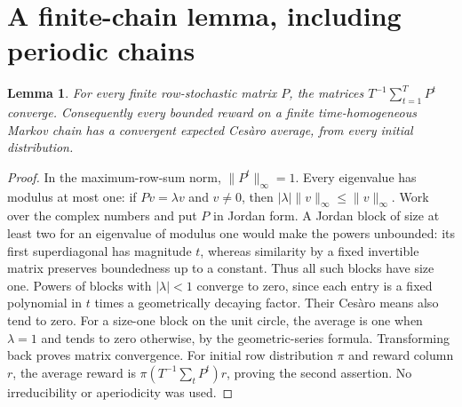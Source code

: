 \documentclass[11pt]{article}
\newtheorem{lemma}[theorem]{Lemma}
\theoremstyle{remark}
\begin{document}
\section{A finite-chain lemma, including periodic chains}
\begin{lemma}\label{cesaro}
For every finite row-stochastic matrix $P$, the matrices
$T^{-1}\sum_{t=1}^T P^t$ converge. Consequently every bounded reward on a finite time-homogeneous Markov chain has a convergent expected Ces\`aro average, from every initial distribution.
\end{lemma}
\begin{proof}
In the maximum-row-sum norm, $\|P^t\|_\infty=1$. Every eigenvalue has modulus at most one: if $Pv=\lambda v$ and $v\ne0$, then $|\lambda|\|v\|_\infty\leq\|v\|_\infty$. Work over the complex numbers and put $P$ in Jordan form. A Jordan block of size at least two for an eigenvalue of modulus one would make the powers unbounded: its first superdiagonal has magnitude $t$, whereas similarity by a fixed invertible matrix preserves boundedness up to a constant. Thus all such blocks have size one. Powers of blocks with $|\lambda|<1$ converge to zero, since each entry is a fixed polynomial in $t$ times a geometrically decaying factor. Their Ces\`aro means also tend to zero. For a size-one block on the unit circle, the average is one when $\lambda=1$ and tends to zero otherwise, by the geometric-series formula. Transforming back proves matrix convergence. For initial row distribution $\pi$ and reward column $r$, the average reward is $\pi(T^{-1}\sum_tP^t)r$, proving the second assertion. No irreducibility or aperiodicity was used.
\end{proof}
\end{document}
